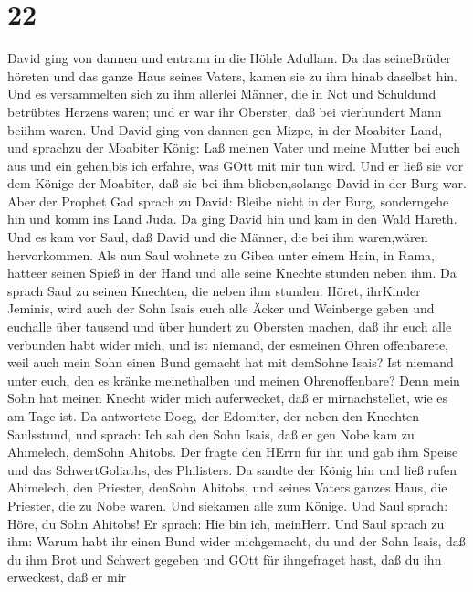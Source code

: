 \hypertarget{section-21}{%
\section{22}\label{section-21}}

 David ging von dannen und entrann in die Höhle Adullam. Da
das seineBrüder höreten und das ganze Haus seines Vaters, kamen sie zu
ihm hinab daselbst hin.  Und es versammelten sich zu ihm
allerlei Männer, die in Not und Schuldund betrübtes Herzens waren; und
er war ihr Oberster, daß bei vierhundert Mann beiihm waren. 
Und David ging von dannen gen Mizpe, in der Moabiter Land, und sprachzu
der Moabiter König: Laß meinen Vater und meine Mutter bei euch aus und
ein gehen,bis ich erfahre, was GOtt mit mir tun wird.  Und
er ließ sie vor dem Könige der Moabiter, daß sie bei ihm blieben,solange
David in der Burg war.  Aber der Prophet Gad sprach zu
David: Bleibe nicht in der Burg, sonderngehe hin und komm ins Land Juda.
Da ging David hin und kam in den Wald Hareth.  Und es kam
vor Saul, daß David und die Männer, die bei ihm waren,wären
hervorkommen. Als nun Saul wohnete zu Gibea unter einem Hain, in Rama,
hatteer seinen Spieß in der Hand und alle seine Knechte stunden neben
ihm.  Da sprach Saul zu seinen Knechten, die neben ihm
stunden: Höret, ihrKinder Jeminis, wird auch der Sohn Isais euch alle
Äcker und Weinberge geben und euchalle über tausend und über hundert zu
Obersten machen,  daß ihr euch alle verbunden habt wider
mich, und ist niemand, der esmeinen Ohren offenbarete, weil auch mein
Sohn einen Bund gemacht hat mit demSohne Isais? Ist niemand unter euch,
den es kränke meinethalben und meinen Ohrenoffenbare? Denn mein Sohn hat
meinen Knecht wider mich auferwecket, daß er mirnachstellet, wie es am
Tage ist.  Da antwortete Doeg, der Edomiter, der neben den
Knechten Saulsstund, und sprach: Ich sah den Sohn Isais, daß er gen Nobe
kam zu Ahimelech, demSohn Ahitobs.  Der fragte den HErrn
für ihn und gab ihm Speise und das SchwertGoliaths, des Philisters.
 Da sandte der König hin und ließ rufen Ahimelech, den
Priester, denSohn Ahitobs, und seines Vaters ganzes Haus, die Priester,
die zu Nobe waren. Und siekamen alle zum Könige.  Und Saul
sprach: Höre, du Sohn Ahitobs! Er sprach: Hie bin ich, meinHerr.
 Und Saul sprach zu ihm: Warum habt ihr einen Bund wider
michgemacht, du und der Sohn Isais, daß du ihm Brot und Schwert gegeben
und GOtt für ihngefraget hast, daß du ihn erweckest, daß er mir
